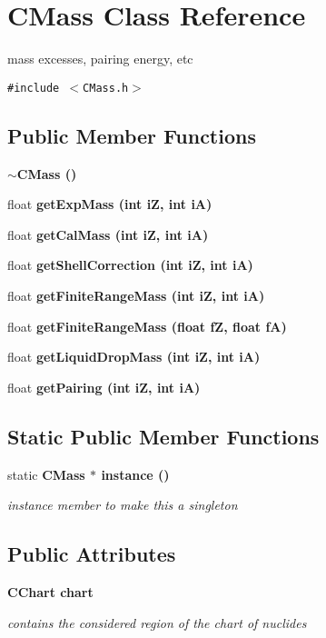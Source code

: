 \section{CMass Class Reference}
\label{classCMass}
mass excesses, pairing energy, etc  


{\tt \#include $<$CMass.h$>$}

\subsection*{Public Member Functions}
\begin{CompactItemize}
\item 
\bf{$\sim$CMass} ()
\item 
float \bf{get\-Exp\-Mass} (int i\-Z, int i\-A)
\item 
float \bf{get\-Cal\-Mass} (int i\-Z, int i\-A)
\item 
float \bf{get\-Shell\-Correction} (int i\-Z, int i\-A)
\item 
float \bf{get\-Finite\-Range\-Mass} (int i\-Z, int i\-A)
\item 
float \bf{get\-Finite\-Range\-Mass} (float f\-Z, float f\-A)
\item 
float \bf{get\-Liquid\-Drop\-Mass} (int i\-Z, int i\-A)
\item 
float \bf{get\-Pairing} (int i\-Z, int i\-A)
\end{CompactItemize}
\subsection*{Static Public Member Functions}
\begin{CompactItemize}
\item 
static \bf{CMass} $\ast$ \bf{instance} ()\label{classCMass_51bdc5af6783bf9c96a9aeab104caa94}

\begin{CompactList}\small\item\em instance member to make this a singleton \item\end{CompactList}\end{CompactItemize}
\subsection*{Public Attributes}
\begin{CompactItemize}
\item 
\bf{CChart} \bf{chart}\label{classCMass_e5d95a0ee9d51723b0eda2ef6e0828b3}

\begin{CompactList}\small\item\em contains the considered region of the chart of nuclides \item\end{CompactList}\end{CompactItemize}
